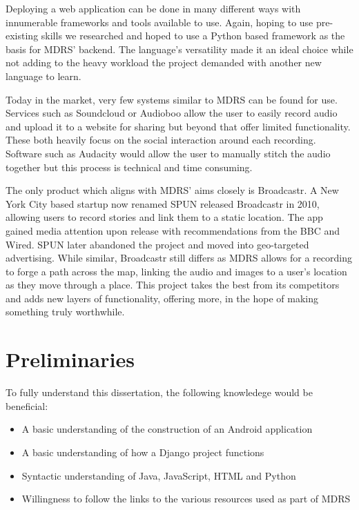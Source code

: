 \documentclass{l3proj}
\begin{document}
Deploying a web application can be done in many different ways with innumerable frameworks and tools available to use. Again, hoping to use pre-existing skills we researched and hoped to use a \gls{Python} based framework as the basis for MDRS’ backend.  The language's versatility made it an ideal choice while not adding to the heavy workload the project demanded with another new language to learn.

Today in the market, very few systems similar to MDRS can be found for use. Services such as Soundcloud or Audioboo allow the user to easily record audio and upload it to a website for sharing but beyond that offer limited functionality. These both heavily focus on the social interaction around each recording. Software such as Audacity would allow the user to manually stitch the audio together but this process is technical and time consuming.

The only product which aligns with MDRS' aims closely is Broadcastr\cite{broadcastr}. A New York City based startup now renamed SPUN released Broadcastr in 2010, allowing users to record stories and link them to a static location. The app gained media attention upon release with recommendations from the BBC and Wired. SPUN later abandoned the project and moved into geo-targeted advertising\cite{crunchprofilebroadcastr}. While similar, Broadcastr still differs as MDRS allows for a recording to forge a path across the map, linking the audio and images to a user’s location as they move through a place. This project takes the best from its competitors and adds new layers of functionality, offering more, in the hope of making something truly worthwhile.

\section{Preliminaries}
To fully understand this dissertation, the following knowledege would be beneficial:
\begin{itemize}
\item A basic understanding of the construction of an Android application
\item A basic understanding of how a \gls{Django} project functions
\item Syntactic understanding of Java, \gls{JavaScript}, HTML and \gls{Python}
\item Willingness to follow the links to the various resources used as part of MDRS
\end{itemize}
\end{document}

